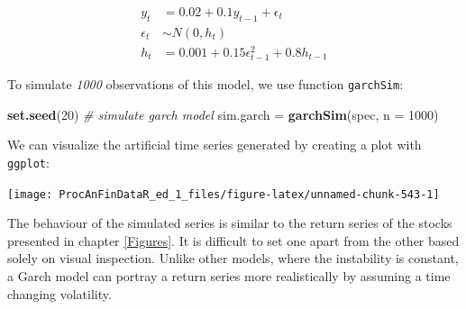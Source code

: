 \documentclass[11pt,]{book}
\newenvironment{Shaded}{\begin{snugshade}}{\end{snugshade}}
\newcommand{\KeywordTok}[1]{\textcolor[rgb]{0.27,0.27,0.27}{\textbf{#1}}}
\newcommand{\DataTypeTok}[1]{\textcolor[rgb]{0.27,0.27,0.27}{#1}}
\newcommand{\DecValTok}[1]{\textcolor[rgb]{0.06,0.06,0.06}{#1}}
\newcommand{\StringTok}[1]{\textcolor[rgb]{0.5,0.5,0.5}{#1}}
\newcommand{\CommentTok}[1]{\textcolor[rgb]{0.56,0.35,0.01}{\textit{#1}}}
\newcommand{\OperatorTok}[1]{\textcolor[rgb]{0.81,0.36,0.00}{\textbf{#1}}}
\newcommand{\NormalTok}[1]{#1}
\begin{document}
\[\begin{aligned} y _t &=  0.02 + 0.1 y_{t-1} + \epsilon _t \\\epsilon _t &\sim N \left(0, h _t \right ) \\h _t &= 0.001 + 0.15 \epsilon ^2 _{t-1}+ 0.8 h_{t-1} \end{aligned} \]

To simulate \emph{1000} observations of this model, we use function
\texttt{garchSim}:

\begin{Shaded}
\begin{Highlighting}[]
\KeywordTok{set.seed}\NormalTok{(}\DecValTok{20}\NormalTok{)}
\CommentTok{# simulate garch model}
\NormalTok{sim.garch =}\StringTok{ }\KeywordTok{garchSim}\NormalTok{(spec, }\DataTypeTok{n =} \DecValTok{1000}\NormalTok{)}
\end{Highlighting}
\end{Shaded}

We can visualize the artificial time series generated by creating a plot
with \texttt{ggplot}:

\begin{Shaded}
\end{Shaded}

\begin{center}\texttt{[image: ProcAnFinDataR\_ed\_1\_files/figure-latex/unnamed-chunk-543-1]} \end{center}

The behaviour of the simulated series is similar to the return series of
the stocks presented in chapter \ref{Figures}. It is difficult to set
one apart from the other based solely on visual inspection. Unlike other
models, where the instability is constant, a Garch model can portray a
return series more realistically by assuming a time changing volatility.
\end{document}
